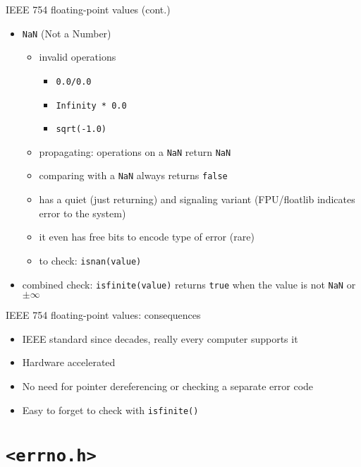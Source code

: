 \documentclass[aspectratio=169,14pt]{beamer}
\begin{document}
\begin{frame}{IEEE 754 floating-point values (cont.)}
\begin{itemize}
    \item \texttt{NaN} (Not a Number)\\
    \begin{itemize}
        \item invalid operations
        \begin{itemize}
            \item \texttt{0.0/0.0}
            \item \texttt{Infinity * 0.0}
            \item \texttt{sqrt(-1.0)}
        \end{itemize}
        \item propagating: operations on a \texttt{NaN} return \texttt{NaN}
        \item comparing with a \texttt{NaN} always returns \texttt{false}
        \item has a quiet (just returning) and signaling variant (FPU/floatlib indicates error to the system)
        \item it even has free bits to encode type of error (rare)
        \item to check: \texttt{isnan(value)}
    \end{itemize}
    \item combined check: \texttt{isfinite(value)} returns \texttt{true} when the value is not \texttt{NaN} or \( \pm \infty \)
\end{itemize}
\end{frame}



\begin{frame}{IEEE 754 floating-point values: consequences}
\begin{itemize}
    \item[\good] IEEE standard since decades, really every computer supports it
    \item[\good] Hardware accelerated
    \item[\good] No need for pointer dereferencing or checking a separate error code
    \item[\bad] Easy to forget to check with \texttt{isfinite()}
\end{itemize}
\end{frame}





\section{\texttt{<errno.h>}}
\end{document}
